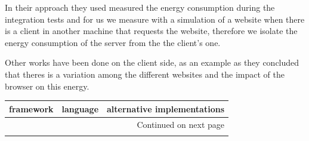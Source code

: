 In their approach they used measured the energy consumption during the integration tests and for us we measure with a simulation of a website when there is a client in another machine that requests the website, therefore we isolate the energy consumption of the server from the the client's one.


Other works have been done on the client side, as an example \cite{philippot_characterization_2014} as they concluded that theres is a variation among the different websites and the impact of the browser on this energy.



\begin{longtable}{lll}
    \toprule
    framework        & language    & alternative implementations                        \\
    \midrule
    \endhead
    \midrule
    \multicolumn{3}{r}{{Continued on next page}}                                        \\
    \midrule
    \endfoot


\end{longtable}
